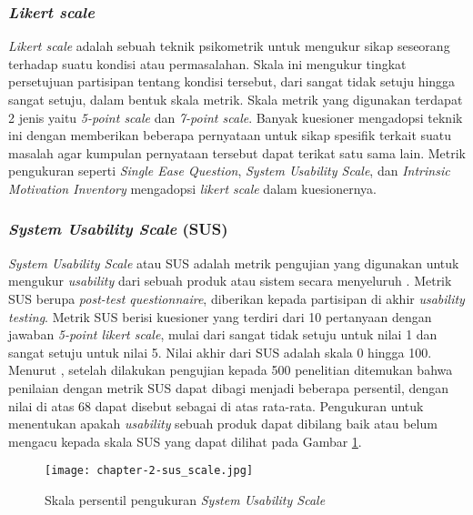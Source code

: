 \subsubsection{\textit{Likert scale}}
\label{subsubsec:likert_scale}
\textit{Likert scale} adalah sebuah teknik psikometrik untuk mengukur sikap seseorang terhadap suatu kondisi atau permasalahan. Skala ini mengukur tingkat persetujuan partisipan tentang kondisi tersebut, dari sangat tidak setuju hingga sangat setuju, dalam bentuk skala metrik. \parencite{likert2015joshi} Skala metrik yang digunakan terdapat 2 jenis yaitu \textit{5-point scale} dan \textit{7-point scale}. Banyak kuesioner mengadopsi teknik ini dengan memberikan beberapa pernyataan untuk sikap spesifik terkait suatu masalah agar kumpulan pernyataan tersebut dapat terikat satu sama lain. Metrik pengukuran seperti \textit{Single Ease Question}, \textit{System Usability Scale}, dan \textit{Intrinsic Motivation Inventory} mengadopsi \textit{likert scale} dalam kuesionernya. 

\subsubsection{\textit{System Usability Scale} (SUS)}
\label{subsubsec:sus}
\textit{System Usability Scale} atau SUS adalah metrik pengujian yang digunakan untuk mengukur \textit{usability} dari sebuah produk atau sistem secara menyeluruh \parencite{sus1995brooke}. Metrik SUS berupa \textit{post-test questionnaire}, diberikan kepada partisipan di akhir \textit{usability testing}. Metrik SUS berisi kuesioner yang terdiri dari 10 pertanyaan dengan jawaban \textit{5-point likert scale}, mulai dari sangat tidak setuju untuk nilai 1 dan sangat setuju untuk nilai 5. Nilai akhir dari SUS adalah skala 0 hingga 100. Menurut \textcite{sus2008bangor}, setelah dilakukan pengujian kepada 500 penelitian ditemukan bahwa penilaian dengan metrik SUS dapat dibagi menjadi beberapa persentil, dengan nilai di atas 68 dapat disebut sebagai di atas rata-rata. Pengukuran untuk menentukan apakah \textit{usability} sebuah produk dapat dibilang baik atau belum mengacu kepada skala SUS yang dapat dilihat pada Gambar \ref{img:sus_scale}.

\begin{figure}[h]
  \centering
  \texttt{[image: chapter-2-sus\_scale.jpg]}
  \caption{Skala persentil pengukuran \textit{System Usability Scale} \parencite{sus2008bangor}}
  \label{img:sus_scale}
\end{figure}
\FloatBarrier

